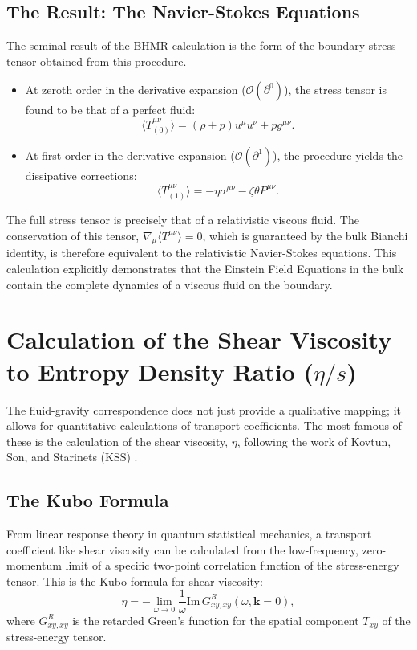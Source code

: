 \documentclass[11pt, letterpaper]{report}
\theoremstyle{plain} %
\theoremstyle{definition} %
\theoremstyle{remark} %
\begin{document}
\subsection{The Result: The Navier-Stokes Equations}
The seminal result of the BHMR calculation is the form of the boundary stress tensor obtained from this procedure.
\begin{itemize}
    \item At zeroth order in the derivative expansion ($\mathcal{O}(\partial^0)$), the stress tensor is found to be that of a perfect fluid:
    $$ \langle T^{\mu\nu}_{(0)} \rangle = (\rho+p)u^\mu u^\nu + p g^{\mu\nu}. $$
    \item At first order in the derivative expansion ($\mathcal{O}(\partial^1)$), the procedure yields the dissipative corrections:
    $$ \langle T^{\mu\nu}_{(1)} \rangle = -\eta \sigma^{\mu\nu} - \zeta \theta P^{\mu\nu}. $$
\end{itemize}
The full stress tensor is precisely that of a relativistic viscous fluid. The conservation of this tensor, $\nabla_\mu \langle T^{\mu\nu} \rangle = 0$, which is guaranteed by the bulk Bianchi identity, is therefore equivalent to the relativistic Navier-Stokes equations. This calculation explicitly demonstrates that the Einstein Field Equations in the bulk contain the complete dynamics of a viscous fluid on the boundary.

\section{Calculation of the Shear Viscosity to Entropy Density Ratio (\texorpdfstring{$\eta/s$}{eta/s})}
\label{app:kss_bound}

The fluid-gravity correspondence does not just provide a qualitative mapping; it allows for quantitative calculations of transport coefficients. The most famous of these is the calculation of the shear viscosity, $\eta$, following the work of Kovtun, Son, and Starinets (KSS) \cite{Kovtun2005Viscosity,Policastro2001AdSCFT}.

\subsection{The Kubo Formula}
From linear response theory in quantum statistical mechanics, a transport coefficient like shear viscosity can be calculated from the low-frequency, zero-momentum limit of a specific two-point correlation function of the stress-energy tensor. This is the Kubo formula for shear viscosity:
\begin{equation}
    \eta = -\lim_{\omega \to 0} \frac{1}{\omega} \text{Im} \, G^R_{xy,xy}(\omega, \mathbf{k}=0),
\end{equation}
where $G^R_{xy,xy}$ is the retarded Green's function for the spatial component $T_{xy}$ of the stress-energy tensor.
\end{document}
